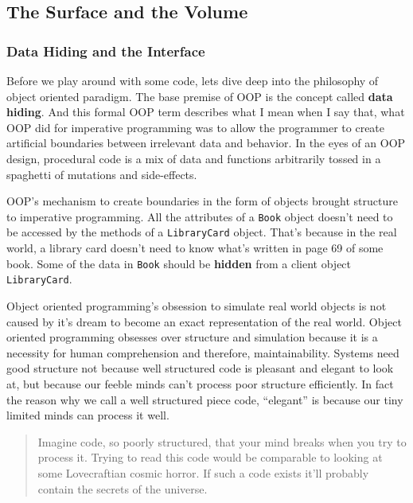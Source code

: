 \subsection{The Surface and the
Volume}\label{object-oriented-programming-paradigm.md__the-surface-and-the-volume}

\subsubsection{Data Hiding and the
Interface}\label{object-oriented-programming-paradigm.md__data-hiding-and-the-interface}

Before we play around with some code, lets dive deep into the philosophy
of object oriented paradigm. The base premise of OOP is the concept
called \textbf{data hiding}. And this formal OOP term describes what I
mean when I say that, what OOP did for imperative programming was to
allow the programmer to create artificial boundaries between irrelevant
data and behavior. In the eyes of an OOP design, procedural code is a
mix of data and functions arbitrarily tossed in a spaghetti of mutations
and side-effects.

OOP's mechanism to create boundaries in the form of objects brought
structure to imperative programming. All the attributes of a
\texttt{Book} object doesn't need to be accessed by the methods of a
\texttt{LibraryCard} object. That's because in the real world, a library
card doesn't need to know what's written in page 69 of some book. Some
of the data in \texttt{Book} should be \textbf{hidden} from a client
object \texttt{LibraryCard}.

Object oriented programming's obsession to simulate real world objects
is not caused by it's dream to become an exact representation of the
real world. Object oriented programming obsesses over structure and
simulation because it is a necessity for human comprehension and
therefore, maintainability. Systems need good structure not because well
structured code is pleasant and elegant to look at, but because our
feeble minds can't process poor structure efficiently. In fact the
reason why we call a well structured piece code, ``elegant'' is because
our tiny limited minds can process it well.

\begin{quote}
Imagine code, so poorly structured, that your mind breaks when you try
to process it. Trying to read this code would be comparable to looking
at some Lovecraftian cosmic horror. If such a code exists it'll probably
contain the secrets of the universe.
\end{quote}

